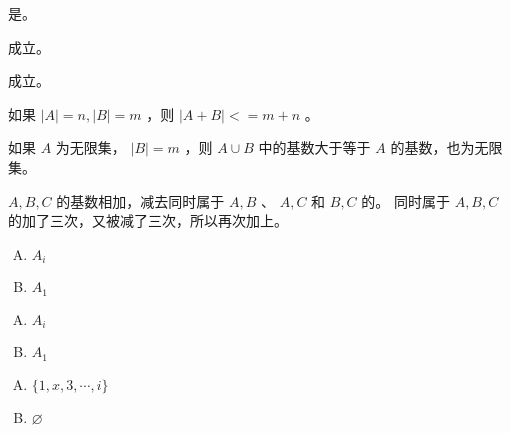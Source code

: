 {{        %
        \begin{practices}
            是。
        \end{practices}

        \begin{practices}
            成立。
        \end{practices}

        \begin{practices}
            成立。
        \end{practices}

        \begin{practices}
            如果 $|A| = n, |B| = m$ ，则 $|A + B| <= m + n$ 。
        \end{practices}

        \begin{practices}
            如果 $A$ 为无限集， $|B| = m$ ，则 $A \cup B$ 中的基数大于等于 $A$ 的基数，也为无限集。
        \end{practices}

        \begin{practices}
            $A, B, C$ 的基数相加，减去同时属于 $A, B$ 、 $A, C$ 和 $B, C$ 的。
            同时属于 $A, B, C$ 的加了三次，又被减了三次，所以再次加上。
        \end{practices}

        \begin{practices}
            \begin{enumerate}[A.]
                \item $A_i$
                \item $A_1$
            \end{enumerate}
        \end{practices}

        \begin{practices}
            \begin{enumerate}[A.]
                \item $A_i$
                \item $A_1$
            \end{enumerate}
        \end{practices}

        \begin{practices}
            \begin{enumerate}[A.]
                \item $\{1, x, 3, \cdots , i\}$
                \item $\varnothing$
            \end{enumerate}
        \end{practices}

}}
